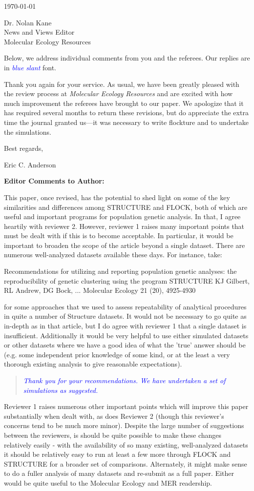 \documentclass[11pt]{letter}
\newcommand{\reply}[1]{\begin{quotation}\small\sl\textcolor{blue}{#1}\end{quotation}}
\begin{document}
\begin{letter}{ \today 

Dr. Nolan Kane\\
News and Views Editor\\
Molecular Ecology Resources \\
}
Below, we address individual comments from you and the referees.  Our replies are in \textcolor{blue}{{\sl blue slant}} font.

Thank you again for your service.  As usual, we have been greatly pleased with the review process
at {\em Molecular Ecology Resources} and are excited with how much improvement the referees have brought
to our paper.  We apologize that it has required several months to return these revisions, but do appreciate
the extra time the journal granted us---it was necessary to write {\sc flockture} and to undertake the
simulations.  

Best regards,

Eric C. Anderson

\vspace*{3em}

{\bf Editor Comments to Author:}


This paper, once revised, has the potential to shed light on some of the key similarities and differences among STRUCTURE and FLOCK, both of which are useful and important programs for population genetic analysis.  In that, I agree heartily with reviewer 2. However, reviewer 1 raises many important points that must be dealt with if this is to become acceptable. In particular, it would be important to broaden the scope of the article beyond a single dataset.  There are numerous well-analyzed datasets available these days.  For instance, take:

Recommendations for utilizing and reporting population genetic analyses: the reproducibility of genetic clustering using the program STRUCTURE
KJ Gilbert, RL Andrew, DG Bock, ...
Molecular Ecology 21 (20), 4925-4930

for some approaches that we used to assess repeatability of analytical procedures in quite a number of Structure datasets.  It would not be necessary to go quite as in-depth as in that article, but I do agree with reviewer 1 that a single dataset is insufficient.  Additionally it would be very helpful to use either simulated datasets or other datasets where we have a good idea of what the 'true' answer should be (e.g. some independent prior knowledge of some kind, or at the least a very thorough existing analysis to give reasonable expectations).

\reply{Thank you for your recommendations.  We have undertaken a set of simulations as suggested.}

Reviewer 1 raises numerous other important points which will improve this paper substantially when dealt with, as does Reviewer 2 (though this reviewer's concerns tend to be much more minor). Despite the large number of suggestions between the reviewers, is should be quite possible to make these changes relatively easily - with the availability of so many existing, well-analyzed datasets it should be relatively easy to run at least a few more through FLOCK and STRUCTURE for a broader set of comparisons.  Alternately, it might make sense to do a fuller analysis of many datasets and re-submit as a full paper. Either would be quite useful to the Molecular Ecology and MER readership.


\end{letter}
\end{document}
